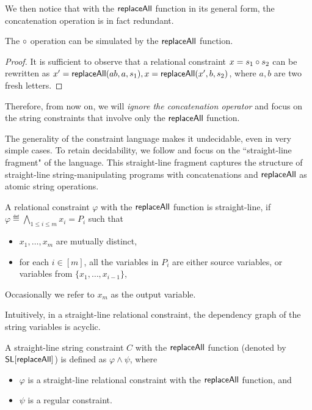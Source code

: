 We then notice that with the $\mathsf{replaceAll}$ function in its general form, the concatenation operation is in fact redundant.

\begin{proposition}\label{prop-concat}
	The $\circ$ operation can be simulated  by the $\mathsf{replaceAll}$ function.
\end{proposition}
\begin{proof}
	It is sufficient to observe that %
	a relational constraint $x = s_1 \circ s_2$ can be rewritten as $x' = \mathsf{replaceAll}(ab, a, s_1), x = \mathsf{replaceAll}(x', b, s_2)$, where $a,b$ are two fresh letters.
\end{proof}

Therefore, from now on, we will \emph{ignore the concatenation operator} and focus on the string constraints that involve only the $\mathsf{replaceAll}$ function.

The generality of the constraint language makes it undecidable,
even in very simple cases. To retain decidability, we follow \cite{LB16} and focus on the ``straight-line fragment" of the language. This straight-line fragment captures the structure of straight-line string-manipulating
programs with concatenations and $\mathsf{replaceAll}$ as atomic string operations.  

\begin{definition}
	A relational constraint $ \varphi$ with the $\mathsf{replaceAll}$ function is straight-line, if $\varphi \eqdef \bigwedge \limits_{1 \le i \le m} x_i = P_i$ such that
	\begin{itemize}
		\item $x_1,\dots, x_m$ are mutually distinct,
		\item for each $i \in [m]$, all the variables in $P_i$ are either source variables, or variables from $\{x_1,\dots, x_{i-1}\}$,
	\end{itemize}
Occasionally we refer to $x_m$ as the output variable. 
\end{definition}
Intuitively, in a straight-line relational constraint, the dependency graph of the string variables is acyclic.



\begin{definition}
	A straight-line string constraint $C$ with the $\mathsf{replaceAll}$ function (denoted by $\mathsf{SL}[\mathsf{replaceAll}]$)  is defined as $ \varphi \wedge \psi$,  where 
	\begin{itemize}
		\item $\varphi$ is a straight-line relational constraint with the $\mathsf{replaceAll}$ function,  and
		\item $\psi$ is a regular constraint.
	\end{itemize}
\end{definition}

